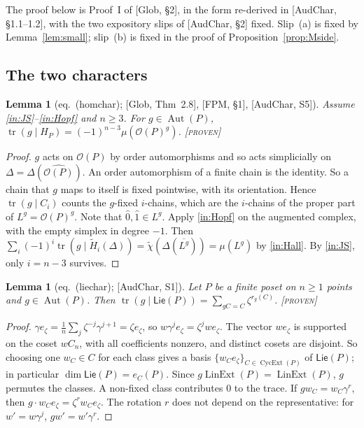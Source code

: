 \documentclass[11pt]{article}
\newtheorem{lemma}[theorem]{Lemma}
\theoremstyle{definition}
\theoremstyle{remark}
\newcommand{\OP}{\mathcal O}
\newcommand{\Lin}{\operatorname{LinExt}}
\newcommand{\Aut}{\operatorname{Aut}}
\newcommand{\Cyc}{\operatorname{CycExt}}
\newcommand{\PLie}{\mathsf{Lie}}
\newcommand{\st}[1]{\textup{[\textsc{#1}]}}
\begin{document}
The proof below is Proof~I of [Glob, \S2], in the form re-derived in
[AudChar, \S1.1--1.2], with the two expository slips of [AudChar, \S2]
fixed. Slip~(a) is fixed by Lemma~\ref{lem:small}; slip~(b) is fixed in the
proof of Proposition~\ref{prop:Mside}.

\subsection{The two characters}

\begin{lemma}[eq.\ (homchar); {[Glob, Thm~2.8]}, {[FPM, \S1]}, {[AudChar, S5]}]
\label{lem:homchar}
Assume \ref{in:JS}--\ref{in:Hopf} and $n\ge3$. For $g\in\Aut(P)$,
$\operatorname{tr}(g\mid H_P)=(-1)^{n-3}\mu(\OP(P)^g)$. \st{proven}
\end{lemma}

\begin{proof}
$g$ acts on $\OP(P)$ by order automorphisms and so acts simplicially on
$\Delta=\Delta(\widehat{\OP(P)})$. An order automorphism of a finite chain is
the identity. So a chain that $g$ maps to itself is fixed pointwise, with its
orientation. Hence $\operatorname{tr}(g\mid C_i)$ counts the $g$-fixed
$i$-chains, which are the $i$-chains of the proper part of
$L^g=\OP(P)^g$. Note that $\hat0,\hat1\in L^g$. Apply \ref{in:Hopf} on the
augmented complex, with the empty simplex in degree $-1$. Then
$\sum_i(-1)^i\operatorname{tr}(g\mid\widetilde H_i(\Delta))
=\widetilde\chi(\Delta(\overline{L^g}))=\mu(L^g)$ by \ref{in:Hall}. By
\ref{in:JS}, only $i=n-3$ survives.
\end{proof}

\begin{lemma}[eq.\ (liechar); {[AudChar, S1]}]\label{lem:liechar}
Let $P$ be a finite poset on $n\ge1$ points and $g\in\Aut(P)$. Then
$\operatorname{tr}(g\mid\PLie(P))=\sum_{gC=C}\zeta^{r_g(C)}$. \st{proven}
\end{lemma}

\begin{proof}
$\gamma e_\zeta=\frac1n\sum_j\zeta^{-j}\gamma^{j+1}=\zeta e_\zeta$, so
$w\gamma^je_\zeta=\zeta^jwe_\zeta$. The vector $we_\zeta$ is supported on the
coset $wC_n$, with all coefficients nonzero, and distinct cosets are disjoint.
So choosing one $w_C\in C$ for each class gives a basis
$\{w_Ce_\zeta\}_{C\in\Cyc(P)}$ of $\PLie(P)$; in particular
$\dim\PLie(P)=e_C(P)$. Since $g\Lin(P)=\Lin(P)$, $g$ permutes the classes.
A non-fixed class contributes $0$ to the trace. If $gw_C=w_C\gamma^r$, then
$g\cdot w_Ce_\zeta=\zeta^rw_Ce_\zeta$. The rotation $r$ does not depend on
the representative: for $w'=w\gamma^j$, $gw'=w'\gamma^r$.
\end{proof}
\end{document}
